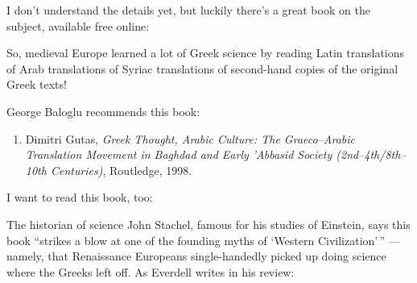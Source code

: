 \documentclass{article}
\def\tightlist{}
\renewcommand{\texttt}[1]{%
  \begingroup
  \ttfamily
  \begingroup\lccode`~=`/\lowercase{\endgroup\def~}{/\discretionary{}{}{}}%
  \begingroup\lccode`~=`[\lowercase{\endgroup\def~}{[\discretionary{}{}{}}%
  \begingroup\lccode`~=`.\lowercase{\endgroup\def~}{.\discretionary{}{}{}}%
  \catcode`/=\active\catcode`[=\active\catcode`.=\active
  \scantokens{#1\noexpand}%
  \endgroup
}
\begin{document}
I don't understand the details yet, but luckily there's a great book on
the subject, available free online:


So, medieval Europe learned a lot of Greek science by reading Latin
translations of Arab translations of Syriac translations of second-hand
copies of the original Greek texts!

George Baloglu recommends this book:

\begin{enumerate}
\def\labelenumi{\arabic{enumi})}
\setcounter{enumi}{5}
\tightlist
\item
  Dimitri Gutas, \emph{Greek Thought, Arabic Culture: The Graeco--Arabic
  Translation Movement in Baghdad and Early 'Abbasid Society
  (2nd--4th/8th--10th Centuries)}, Routledge, 1998.
\end{enumerate}

I want to read this book, too:


The historian of science John Stachel, famous for his studies of
Einstein, says this book ``strikes a blow at one of the founding myths
of `Western Civilization'\,'' --- namely, that Renaissance Europeans
single-handedly picked up doing science where the Greeks left off. As
Everdell writes in his review:
\end{document}
